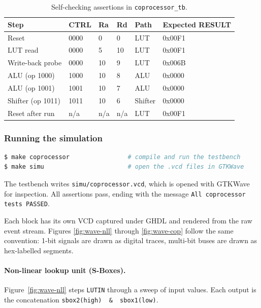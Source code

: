 \documentclass[11pt,a4paper]{article}
\begin{document}
\begin{table}[H]
  \centering
  \caption{Self-checking assertions in \texttt{coprocessor\_tb}.}
  \label{tab:expected}
  \begin{tabular}{@{}llllll@{}}
    \toprule
    \textbf{Step} & \textbf{CTRL} & \textbf{Ra} & \textbf{Rd} & \textbf{Path} & \textbf{Expected RESULT} \\
    \midrule
    Reset                & 0000 & 0    & 0    & LUT     & 0x00F1 \\
    LUT read             & 0000 & 5    & 10   & LUT     & 0x00F1 \\
    Write-back probe     & 0000 & 10   & 9    & LUT     & 0x006B \\
    ALU (op 1000)        & 1000 & 10   & 8    & ALU     & 0x0000 \\
    ALU (op 1001)        & 1001 & 10   & 7    & ALU     & 0x0000 \\
    Shifter (op 1011)    & 1011 & 10   & 6    & Shifter & 0x0000 \\
    Reset after run      & n/a   & n/a  & n/a  & LUT     & 0x00F1 \\
    \bottomrule
  \end{tabular}
\end{table}

\subsubsection*{Running the simulation}

\begin{lstlisting}[language=bash, basicstyle=\ttfamily\footnotesize,
  keywordstyle=\color{kwblue}\bfseries, frame=single,
  backgroundcolor=\color{bgshade}, numbers=none]
$ make coprocessor                # compile and run the testbench
$ make simu                       # open the .vcd files in GTKWave
\end{lstlisting}

\noindent The testbench writes \texttt{simu/coprocessor.vcd}, which is
opened with GTKWave for inspection. All assertions pass, ending with
the message \texttt{All coprocessor tests PASSED}.

Each block has its own VCD captured under GHDL and rendered from the
raw event stream. Figures \ref{fig:wave-nll} through
\ref{fig:wave-cop} follow the same convention: 1-bit signals are
drawn as digital traces, multi-bit buses are drawn as hex-labelled
segments.

\paragraph{Non-linear lookup unit (S-Boxes).}
Figure~\ref{fig:wave-nll} steps \texttt{LUTIN} through a sweep of
input values. Each output is the concatenation
\texttt{sbox2(high) \,\&\, sbox1(low)}.
\end{document}
